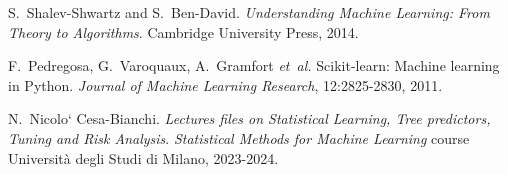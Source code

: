 \documentclass[12pt]{report}
\begin{document}
\begingroup
\setlength{\bibsep}{1pt}
\begin{thebibliography}{9}

S.~Shalev-Shwartz and S.~Ben-David.
\newblock \emph{Understanding Machine Learning: From Theory to Algorithms}.
\newblock Cambridge University Press, 2014.

F.~Pedregosa, G.~Varoquaux, A.~Gramfort \emph{et~al.}
\newblock Scikit-learn: Machine learning in {P}ython.
\newblock \emph{Journal of Machine Learning Research}, 12:2825-2830, 2011.

N.~Nicolo` Cesa-Bianchi.
\newblock \emph{Lectures files on Statistical Learning, Tree predictors, Tuning and
Risk Analysis}. 
\newblock \emph{Statistical Methods for Machine Learning} course Università degli
Studi di Milano, 2023-2024.

\end{thebibliography}
\endgroup
\end{document}

